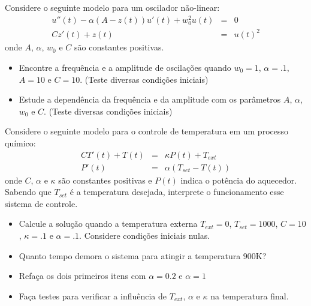 \begin{exer} Considere o seguinte modelo para um oscilador não-linear:
\begin{eqnarray*}
u''(t)-\alpha(A-z(t))u'(t)+w_0^2 u(t)&=&0\\
Cz'(t)+z(t)&=&u(t)^2
\end{eqnarray*}
onde $A$, $\alpha$, $w_0$ e $C$ são constantes positivas.
\begin{itemize}
\item Encontre a frequência e a amplitude de oscilações quando $w_0=1$, $\alpha=.1$, $A=10$ e $C=10$. (Teste diversas condições iniciais)
\item Estude a dependência da frequência e da amplitude com os parâmetros  $A$, $\alpha$, $w_0$ e $C$. (Teste diversas condições iniciais)
\end{itemize}
\end{exer}

\begin{exer} Considere o seguinte modelo para o controle de temperatura em um processo químico:
\begin{eqnarray*}
CT'(t)+T(t)&=&\kappa P(t)+T_{ext}\\
P'(t)&=&\alpha(T_{set}-T(t))
\end{eqnarray*}
onde $C$, $\alpha$ e $\kappa$ são constantes positivas e $P(t)$ indica o potência do aquecedor. Sabendo que $T_{set}$ é a temperatura desejada, interprete o funcionamento esse sistema de controle.
\begin{itemize}
\item Calcule a solução quando a temperatura externa $T_{ext}=0$, $T_{set}=1000$, $C=10$, $\kappa=.1$ e $\alpha=.1$. Considere condições iniciais nulas.
\item Quanto tempo demora o sistema para atingir a temperatura 900K?
\item Refaça os dois primeiros itens com $\alpha=0.2$ e $\alpha=1$
\item Faça testes para verificar a influência de $T_{ext}$, $\alpha$ e $\kappa$ na temperatura final.
\end{itemize}
\end{exer}

